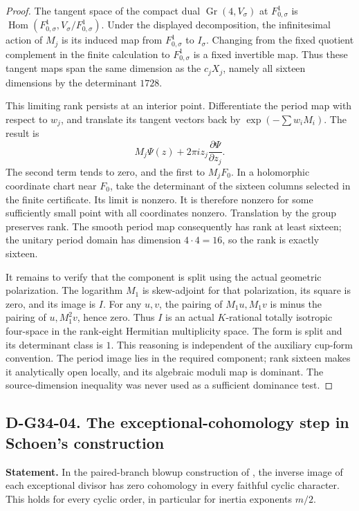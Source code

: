 \begin{proof}
The tangent space of the compact dual \(\operatorname{Gr}(4,V_\sigma)\)
at \(F_{0,\sigma}^1\) is
\(\operatorname{Hom}(F_{0,\sigma}^1,V_\sigma/F_{0,\sigma}^1)\).
Under the displayed decomposition, the infinitesimal action of \(M_j\)
is its induced map from \(F_{0,\sigma}^1\) to \(I_\sigma\).
Changing from the fixed quotient complement in the finite calculation to
\(F_{0,\sigma}^1\) is a fixed invertible map.  Thus these tangent maps
span the same dimension as the \(c_jX_j\), namely all sixteen dimensions
by the determinant \(1728\).

This limiting rank persists at an interior point.  Differentiate the period
map with respect to \(w_j\), and translate its tangent vectors back by
\(\exp(-\sum w_iM_i)\).  The result is
\[
                   M_j\Psi(z)+2\pi i z_j\frac{\partial\Psi}{\partial z_j}.
\]
The second term tends to zero, and the first to \(M_jF_0\).  In a holomorphic
coordinate chart near \(F_0\), take the determinant of the sixteen columns
selected in the finite certificate.  Its limit is nonzero.  It is therefore
nonzero for some sufficiently small point with all coordinates nonzero.
Translation by the group preserves rank.  The smooth period map consequently
has rank at least sixteen; the unitary period domain has dimension
\(4\cdot4=16\), so the rank is exactly sixteen.

It remains to verify that the component is split using the actual geometric
polarization.  The logarithm \(M_1\) is skew-adjoint for that polarization,
its square is zero, and its image is \(I\).  For any \(u,v\), the pairing
of \(M_1u,M_1v\) is minus the pairing of \(u,M_1^2v\), hence zero.  Thus
\(I\) is an actual \(K\)-rational totally isotropic four-space in the
rank-eight Hermitian multiplicity space.  The form is split and its
determinant class is \(1\).  This reasoning is independent of the auxiliary
cup-form convention.  The period image lies in the required component;
rank sixteen makes it analytically open locally, and its algebraic moduli
map is dominant.  The source-dimension inequality was never used as a
sufficient dominance test.
\end{proof}

\subsection*{D-G34-04. The exceptional-cohomology step in Schoen's construction}

\textbf{Statement.} In the paired-branch blowup construction of
\cite[\S2]{G34:Schoen}, the inverse image of each exceptional divisor has
zero cohomology in every faithful cyclic character.  This holds for every
cyclic order, in particular for inertia exponents \(m/2\).

